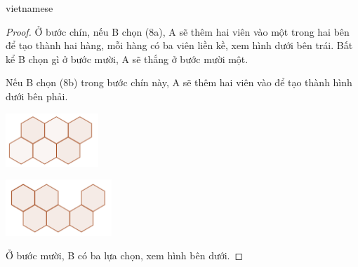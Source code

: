 \documentclass{article}
\begin{document}
\begin{otherlanguage*}{vietnamese}
\begin{proof}
    Ở bước chín, nếu B chọn (8a), A sẽ thêm hai viên vào một trong hai bên để tạo thành hai hàng, mỗi hàng có ba viên liền kề, xem hình dưới bên trái.
    Bất kể B chọn gì ở bước mười, A sẽ thắng ở bước mười một.

    Nếu B chọn (8b) trong bước chín này, A sẽ thêm hai viên vào để tạo thành hình dưới bên phải.

    \begin{center}
        \centering
        \begin{minipage}[t]{3.5cm}
            \begin{center}
                \includegraphics[width=3.5cm]{./svg/pdf/pi-2024-1-p3-9a.pdf}
            \end{center}
        \end{minipage}
        \qquad
        \begin{minipage}[t]{4cm}
            \begin{center}
                \includegraphics[width=4cm]{./svg/pdf/pi-2024-1-p3-9b.pdf}
            \end{center}
        \end{minipage}
    \end{center}

    Ở bước mười, B có ba lựa chọn, xem hình bên dưới.


\end{proof}
\end{otherlanguage*}
\end{document}
